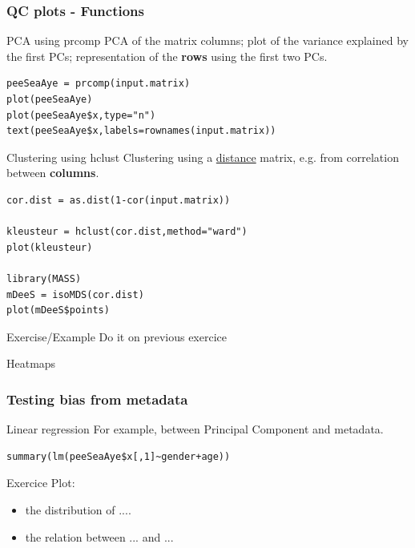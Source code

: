 \documentclass[10pt]{beamer}
\newenvironment{xframe}[2][]
  {\begin{frame}[fragile,environment=xframe,#1]
  \frametitle{#2}}
  {\end{frame}}
\begin{document}
\begin{xframe}[shrink=10]{QC plots - Functions}
  \begin{block}{PCA using {\sf prcomp}}
    PCA of the matrix columns; plot of the variance explained by the first PCs; representation of the {\bf rows} using the first two PCs.
\begin{verbatim}
peeSeaAye = prcomp(input.matrix)
plot(peeSeaAye)
plot(peeSeaAye$x,type="n")
text(peeSeaAye$x,labels=rownames(input.matrix))
\end{verbatim}  
  \end{block}
  \begin{block}{Clustering using {\sf hclust}}
    Clustering using a \uline{distance} matrix, e.g. from correlation between {\bf columns}.
\begin{verbatim}
cor.dist = as.dist(1-cor(input.matrix))

kleusteur = hclust(cor.dist,method="ward")
plot(kleusteur)

library(MASS)
mDeeS = isoMDS(cor.dist)
plot(mDeeS$points)
\end{verbatim}  
  \end{block}
\end{xframe}

\begin{frame}{Exercise/Example}
  Do it on previous exercice
\end{frame}

\begin{frame}{Heatmaps}
  
\end{frame}

\begin{xframe}{Testing bias from metadata}
  \begin{block}{Linear regression}
    For example, between Principal Component and metadata. 
  \end{block}
  \begin{exampleblock}{}
\begin{verbatim}
summary(lm(peeSeaAye$x[,1]~gender+age))
\end{verbatim}  
  \end{exampleblock}
\end{xframe}

\begin{frame}{Exercice}
  Plot: 
  \begin{itemize}
  \item the distribution of ....
  \item the relation between ... and ...
  \end{itemize}
\end{frame}
\end{document}
